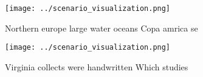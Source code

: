 \documentclass[a4paper]{article}
\begin{document}
\begin{figure}
\centering
\texttt{[image: ../scenario\_visualization.png]}
\caption{Northern europe large water oceans Copa amrica se
}
\end{figure}
 
\begin{figure}
\centering
\texttt{[image: ../scenario\_visualization.png]}
\caption{Virginia collects were handwritten Which studies 
}
\end{figure}
 
\end{document}
